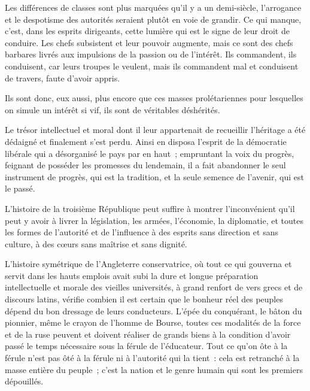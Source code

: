 \documentclass[french,twoside]{book} %
\newcommand{\astermono}{\medskip\centerline{\color{rubric}\large\selectfont{\syms ✻}}\medskip\par}%
\begin{document}
Les différences de classes sont plus marquées qu’il y a un demi-siècle, l’arrogance et le despotisme des autorités seraient plutôt en voie de grandir. Ce qui manque, c’est, dans les esprits dirigeants, cette lumière qui est le signe de leur droit de conduire. Les chefs subsistent et leur pouvoir augmente, mais ce sont des chefs barbares livrés aux impulsions de la passion ou de l’intérêt. Ils commandent, ils conduisent, car leurs troupes le veulent, mais ils commandent mal et conduisent de travers, faute d’avoir appris.\par
Ils sont donc, eux aussi, plus encore que ces masses prolétariennes pour lesquelles on simule un intérêt si vif, ils sont de véritables déshérités.\par
Le trésor intellectuel et moral dont il leur appartenait de recueillir l’héritage a été dédaigné et finalement s’est perdu. Ainsi en disposa l’esprit de la démocratie libérale qui a désorganisé le pays par en haut ; empruntant la voix du progrès, feignant de posséder les promesses du lendemain, il a fait abandonner le seul instrument de progrès, qui est la tradition, et la seule semence de l’avenir, qui est le passé.\par
L’histoire de la troisième République peut suffire à montrer l’inconvénient qu’il peut y avoir à livrer la législation, les armées, l’économie, la diplomatie, et toutes les formes de l’autorité et de l’influence à des esprits sans direction et sans culture, à des cœurs sans maîtrise et sans dignité.\par
L’histoire symétrique de l’Angleterre conservatrice, où tout ce qui gouverna et servit dans les hauts emplois avait subi la dure et longue préparation intellectuelle et morale des vieilles universités, à grand renfort de vers grecs et de discours latins, vérifie combien il est certain que le bonheur réel des peuples dépend du bon dressage de leurs conducteurs. L’épée du conquérant, le bâton du pionnier, même le crayon de l’homme de Bourse, toutes ces modalités de la force et de la ruse peuvent et doivent réaliser de grands biens à la condition d’avoir passé le temps nécessaire sous la férule de l’éducateur. Tout ce qu’on ôte à la férule n’est pas ôté à la férule ni à l’autorité qui la tient : cela est retranché à la masse entière du peuple ; c’est la nation et le genre humain qui sont les premiers dépouillés.\par

\astermono
\end{document}
